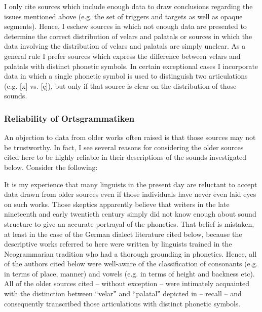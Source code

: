 I only cite sources which include enough data to draw conclusions regarding the issues mentioned above (e.g. the set of triggers and targets as well as opaque segments). Hence, I eschew sources in which not enough data are presented to determine the correct distribution of velars and palatals or sources in which the data involving the distribution of velars and palatals are simply unclear. As a general rule I prefer sources which express the difference between velars and palatals with distinct phonetic symbols. In certain exceptional cases I incorporate data in which a single phonetic symbol is used to distinguish two articulations (e.g. [x] vs. [ç]), but only if that source is clear on the distribution of those sounds.

\subsubsection{Reliability of Ortsgrammatiken}\largerpage

An objection to data from older works often raised is that those sources may not be trustworthy. In fact, I see several reasons for considering the older sources cited here to be highly reliable in their descriptions of the sounds investigated below. Consider the following:

It is my experience that many linguists in the present day are reluctant to accept data drawn from older sources even if those individuals have never even laid eyes on such works. Those skeptics apparently believe that writers in the late nineteenth and early twentieth century simply did not know enough about sound structure to give an accurate portrayal of the phonetics. That belief is mistaken, at least in the case of the German dialect literature cited below, because the descriptive works referred to here were written by linguists trained in the Neogrammarian tradition who had a thorough grounding in phonetics. Hence, all of the authors cited below were well-aware of the classification of consonants (e.g. in terms of place, manner) and vowels (e.g. in terms of height and backness etc). All of the older sources cited -- without exception -- were intimately acquainted with the distinction between “velarˮ and “palatalˮ depicted in  -- recall  -- and consequently transcribed those articulations with distinct phonetic symbols.


